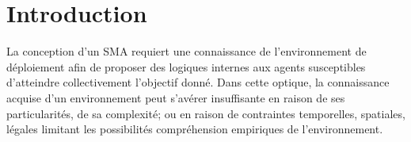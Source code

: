 \documentclass[demonstration]{jfsma}
\newcommand{\jp}[1]{\textbf{\color{red} JPJ: #1}}
\begin{document}

\section{Introduction}







%


La conception d'un SMA requiert une connaissance de l'environnement de déploiement afin de proposer des logiques internes aux agents susceptibles  d'atteindre collectivement l'objectif donné.
%
Dans cette optique, la connaissance acquise d'un environnement peut s'avérer insuffisante en raison de ses particularités, de sa complexité; ou en raison de contraintes temporelles, spatiales, légales limitant les possibilités compréhension empiriques de l'environnement.
\end{document}
